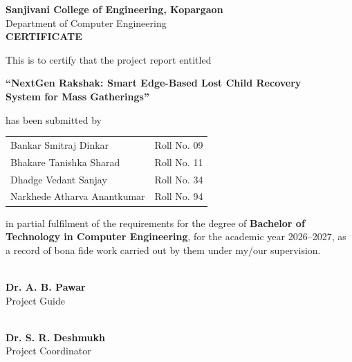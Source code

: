 \documentclass[12pt,a4paper,oneside]{report}
\begin{document}
\thispagestyle{plain}
\vspace*{\fill}
\begin{center}
{\Large\bfseries Sanjivani College of Engineering, Kopargaon}\\[0.1cm]
{\normalsize Department of Computer Engineering}\\[0.6cm]
{\Large\bfseries CERTIFICATE}
\end{center}
\vspace{0.4cm}

This is to certify that the project report entitled

\begin{center}
\textbf{\large ``NextGen Rakshak: Smart Edge-Based Lost Child Recovery\\ System for Mass Gatherings''}
\end{center}

\noindent has been submitted by

\begin{center}
\begin{tabular}{ll}
Bankar Smitraj Dinkar       & Roll No. 09 \\
Bhakare Tanishka Sharad     & Roll No. 11 \\
Dhadge Vedant Sanjay        & Roll No. 34 \\
Narkhede Atharva Anantkumar & Roll No. 94 \\
\end{tabular}
\end{center}

\noindent in partial fulfilment of the requirements for the degree of \textbf{Bachelor of
Technology in Computer Engineering}, for the academic year 2026--2027, as a
record of bona fide work carried out by them under my/our supervision.

\vspace{1.0cm}
\begin{minipage}[t]{0.48\textwidth}
\centering
\vspace{0.6cm}
\hrulefill\\
\textbf{Dr. A. B. Pawar}\\
Project Guide
\end{minipage}
\hfill
\begin{minipage}[t]{0.48\textwidth}
\centering
\vspace{0.6cm}
\hrulefill\\
\textbf{Dr. S. R. Deshmukh}\\
Project Coordinator
\end{minipage}
\end{document}

